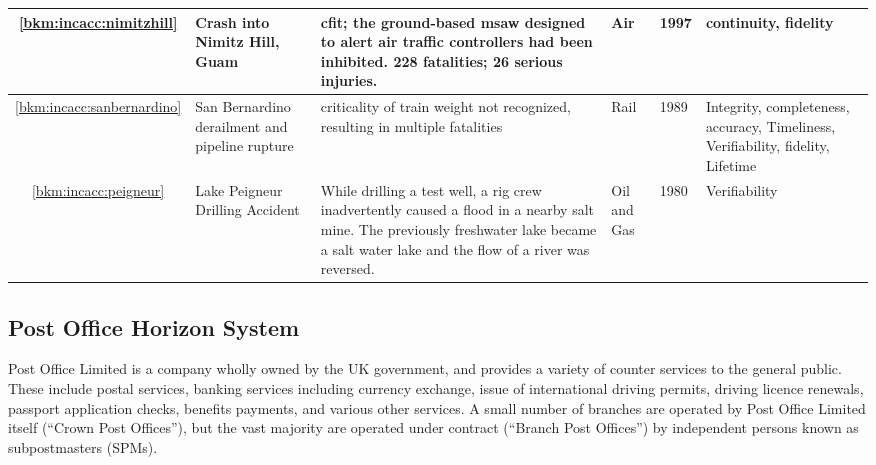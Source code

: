 \begin{longtable}{|C{}|L{}|L{}|L{}|L{}|L{}|}
	\hline
	\ref{bkm:incacc:nimitzhill} & Crash into Nimitz Hill, Guam & \Gls{cfit}; the ground-based \gls{msaw} designed to alert air traffic controllers had been inhibited. 228 fatalities; 26 serious injuries. & Air & 1997 & \Gls{continuity}, \gls{fidelity}\\
	\hline
        \ref{bkm:incacc:sanbernardino} &
        San Bernardino  derailment and pipeline rupture & \Gls{criticality} of train weight not recognized,
        resulting in multiple fatalities &
        Rail & 1989 & Integrity, \gls{completeness}, \gls{accuracy}, Timeliness, Verifiability, \gls{fidelity}, Lifetime \\
        \hline
	\ref{bkm:incacc:peigneur} & Lake Peigneur Drilling Accident & While drilling a test well, a rig crew inadvertently caused a flood in a nearby salt mine. The previously freshwater lake became a salt water lake and the flow of a river was reversed. & Oil and Gas & 1980 & Verifiability \\
	\hline

\end{longtable}

\subsection{Post Office Horizon System}\label{bkm:incacc:horizon}
Post Office Limited is a company wholly owned by the UK government, and provides a variety of counter services to the general public. These include postal services, banking services including currency exchange, issue of international driving permits, driving licence renewals, passport application checks, benefits payments, and various other services. A small number of branches are operated by Post Office Limited itself (``Crown Post Offices''), but the vast majority are operated under contract (``Branch Post Offices'') by independent persons known as subpostmasters (SPMs).

